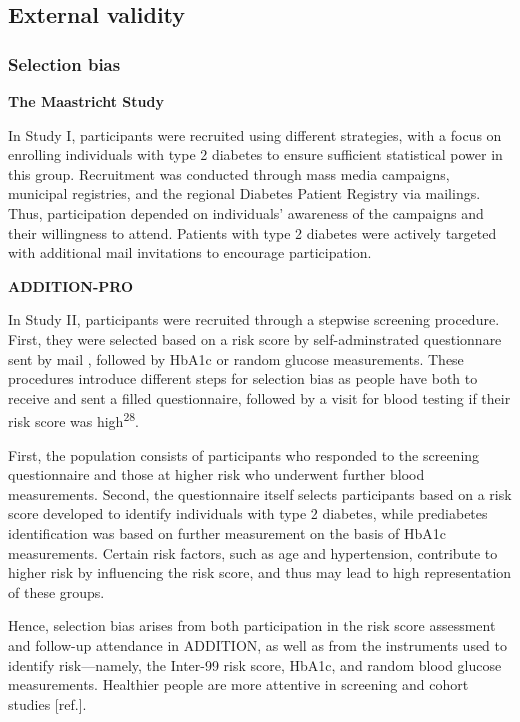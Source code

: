 \documentclass[
  a4paper,
  headsepline=true,
  open=any]{scrbook}
\begin{document}
\hypertarget{external-validity}{%
\subsection{External validity}\label{external-validity}}

\hypertarget{selection-bias}{%
\subsubsection{Selection bias}\label{selection-bias}}

\textbf{The Maastricht Study}

In Study I, participants were recruited using different strategies, with
a focus on enrolling individuals with type 2 diabetes to ensure
sufficient statistical power in this group. Recruitment was conducted
through mass media campaigns, municipal registries, and the regional
Diabetes Patient Registry via mailings. Thus, participation depended on
individuals' awareness of the campaigns and their willingness to attend.
Patients with type 2 diabetes were actively targeted with additional
mail invitations to encourage participation.

\textbf{ADDITION-PRO}

In Study II, participants were recruited through a stepwise screening
procedure. First, they were selected based on a risk score by
self-adminstrated questionnare sent by mail , followed by HbA1c or
random glucose measurements. These procedures introduce different steps
for selection bias as people have both to receive and sent a filled
questionnaire, followed by a visit for blood testing if their risk score
was high\textsuperscript{28}.

First, the population consists of participants who responded to the
screening questionnaire and those at higher risk who underwent further
blood measurements. Second, the questionnaire itself selects
participants based on a risk score developed to identify individuals
with type 2 diabetes, while prediabetes identification was based on
further measurement on the basis of HbA1c measurements. Certain risk
factors, such as age and hypertension, contribute to higher risk by
influencing the risk score, and thus may lead to high representation of
these groups.

Hence, selection bias arises from both participation in the risk score
assessment and follow-up attendance in ADDITION, as well as from the
instruments used to identify risk---namely, the Inter-99 risk score,
HbA1c, and random blood glucose measurements. Healthier people are more
attentive in screening and cohort studies {[}ref.{]}.
\end{document}
